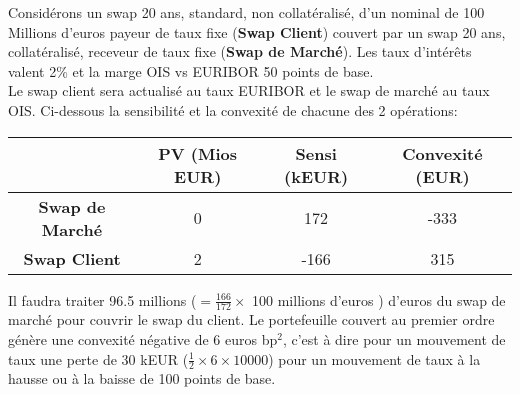 \documentclass{article}
\begin{document}
Considérons un swap 20 ans, standard, non collatéralisé, d'un nominal de 100 Millions d'euros payeur de taux fixe (\textbf{Swap Client}) couvert par un swap 20 ans, collatéralisé, receveur de taux fixe (\textbf{Swap de Marché}). Les taux d'intérêts valent 2\% et la marge OIS vs EURIBOR 50 points de base.\\

Le swap client sera actualisé au taux EURIBOR et le swap de marché au taux OIS. Ci-dessous la sensibilité et la convexité de chacune des 2 opérations:
\begin{center}
\begin{tabular}{|c|c|c|c|}
\hline
&\textbf{PV (Mios EUR)}&\textbf{Sensi (kEUR)}& \textbf{Convexité (EUR)}  \\ 
\hline
\textbf{Swap de Marché} & 0&172&-333 \\ 
\hline
\textbf{Swap Client} & 2&-166&315 \\ 
\hline
\end{tabular}
\end{center}

Il faudra traiter 96.5 millions ($=\frac{166}{172} \times $ 100 millions d'euros ) d'euros du swap de marché pour couvrir le swap du client. Le portefeuille couvert au premier ordre génère une convexité négative de 6 euros bp$^2$, c'est à dire pour un mouvement de taux une perte de 30 kEUR ($\frac{1}{2} \times 6 \times 10000 $) pour un mouvement de taux à la hausse ou à la baisse de 100 points de base.    
  
\end{document}
